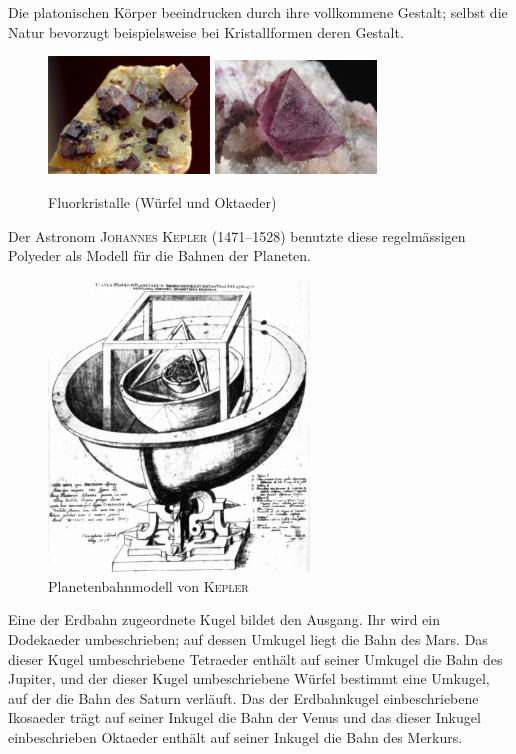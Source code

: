 \documentclass[%
11pt,%
twoside,%
titlepage,%
german,%
headsepline%
]{scrartcl}
\begin{document}
Die platonischen K\"orper beeindrucken durch ihre vollkommene Gestalt; selbst die Natur bevorzugt beispielsweise bei Kristallformen deren Gestalt.
\begin{figure}
\begin{center}
\includegraphics[width=0.382\textwidth]{pictures/kristallh}
\includegraphics[width=0.382\textwidth]{pictures/kristallo}
\end{center}
\caption{Fluorkristalle (W\"urfel und Oktaeder)}
\end{figure}
Der Astronom \textsc{Johannes Kepler} (1471--1528) benutzte diese regelm\"assigen Polyeder als Modell f\"ur die Bahnen der Planeten.
\begin{figure}
\begin{center}
\includegraphics[width=0.618\textwidth]{pictures/kepler}
\end{center}
\caption{Planetenbahnmodell von \textsc{Kepler}}
\end{figure}
Eine der Erdbahn zugeordnete Kugel bildet den Ausgang. Ihr wird ein Dodekaeder umbeschrieben; auf dessen Umkugel liegt die Bahn des Mars. Das dieser Kugel umbeschriebene Tetraeder enth\"alt auf seiner Umkugel die Bahn des Jupiter, und der dieser Kugel umbeschriebene W\"urfel bestimmt eine Umkugel, auf der die Bahn des Saturn verl\"auft. Das der Erdbahnkugel einbeschriebene Ikosaeder tr\"agt auf seiner Inkugel die Bahn der Venus und das dieser Inkugel einbeschrieben Oktaeder enth\"alt auf seiner Inkugel die Bahn des Merkurs.
\end{document}

